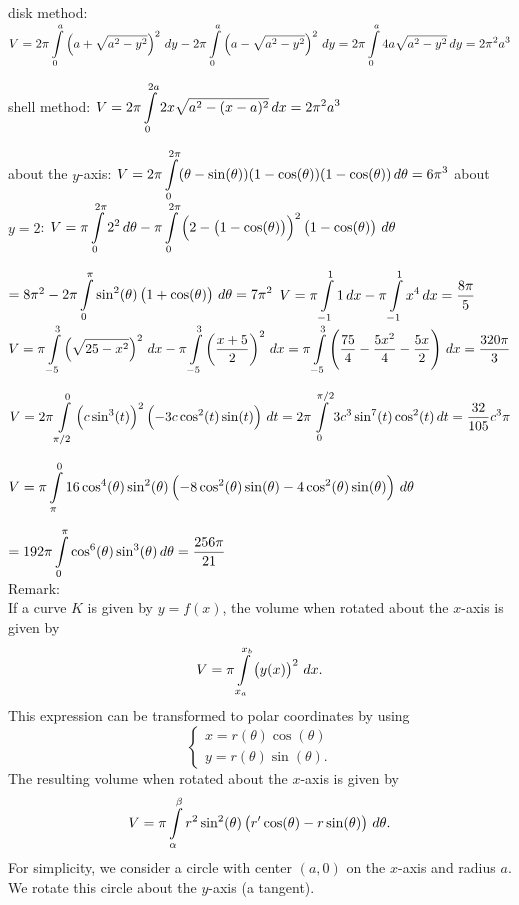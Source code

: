 \begin{Answer}
    disk method:	$V = 2\pi \displaystyle \int\limits_{0}^{a} \left(a + \sqrt{a^2 - y^2}  \right)^2 \, dy - 2\pi \displaystyle \int\limits_{0}^{a} \left(a - \sqrt{a^2 - y^2}  \right)^2 \, dy = 2\pi \displaystyle \int\limits_{0}^{a} 4a \sqrt{a^2 - y^2}  \, dy =  2 \pi^2 a^3$
    
     shell method:	$V = 2\pi \displaystyle \int\limits_{0}^{2a} 2x \sqrt{a^2 - (x-a)^2} \, dx = 2 \pi^2 a^3$
    \fi
    
    \ifanalysis
    \Question \subQuestion about the $y$-axis: $V = 2 \pi \displaystyle \int\limits_{0}^{2\pi} (\theta - \sin(\theta))(1-\cos(\theta))(1-\cos(\theta))  \, d\theta  = 6\pi^3$
    \subQuestion  about $y=2$: $V = \pi \displaystyle \int\limits_{0}^{2\pi} 2^2 \, d\theta-  \pi \displaystyle \int\limits_{0}^{2\pi} \left( 2 - \left(1-\cos(\theta)\right) \right)^2\left(1-\cos(\theta)\right)  \, d\theta $ \par
    \hspace{3cm} $= 8 \pi^2 - 2 \pi \displaystyle \int\limits_{0}^{\pi} \sin^2(\theta)\left(1+\cos(\theta)\right)  \, d\theta = 7 \pi^2$
    \Question $V = \pi \displaystyle \int\limits_{-1}^{1} 1 \, dx - \pi \displaystyle \int\limits_{-1}^{1} x^4 \, dx = \dfrac{8 \pi}{5}$ 
    \Question $V = \pi \displaystyle \int\limits_{-5}^{3}\left(\sqrt{25-x^2}\right)^2 \, dx - \pi \displaystyle \int\limits_{-5}^{3} \left(\dfrac{x+5}{2} \right)^2 \, dx =  \pi \displaystyle \int\limits_{-5}^{3}\left(\dfrac{75}{4} - \dfrac{5x^2}{4} - \dfrac{5x}{2} \right) \, dx = \dfrac{320 \pi}{3}  $
    
    \Question $V = 2 \pi \displaystyle \int\limits_{\pi/2}^{0} \left( c \sin^3(t) \right)^2 \left(-3c \cos^2(t) \sin(t) \right) \, dt = 2 \pi \displaystyle \int\limits_{0}^{\pi/2} 3 c^3 \sin^7(t) \cos^2(t) \, dt = \dfrac{32}{105}c^3 \pi $
     
    \Question $V = 
    \pi \displaystyle \int\limits_{\pi}^{0} 16 \cos^4(\theta)\sin^2(\theta) \left( -8 \cos^2(\theta)\sin(\theta) -4 \cos^2(\theta)\sin(\theta) \right) \, d\theta$ \par
    \hspace{0.3cm} $=192 \pi \displaystyle \int\limits_{0}^{\pi} \cos^6(\theta)\sin^3(\theta) \, d\theta = \dfrac{256 \pi}{21}$ \\[0.2cm]
    Remark: \\
    If a curve $K$ is given by $y=f(x)$, the volume when rotated about the $x$-axis is given by
    \[ V = \pi \displaystyle \int\limits_{x_a}^{x_b} \left( y(x) \right)^2 \, dx. \]
    This expression can be transformed to polar coordinates by using
    \[ \left\{ \begin{array}{l} x = r(\theta) \cos(\theta) \\ y = r(\theta) \sin(\theta). \end{array} \right. \]
    The resulting volume when rotated about the $x$-axis is given by
    \[  V = \pi \displaystyle \int\limits_{\alpha}^{\beta} r^2 \sin^2(\theta)\left( r' \cos(\theta) - r \sin(\theta) \right) \, d\theta.   \]
    \Question For simplicity, we consider a circle with center $(a,0)$ on the $x$-axis and radius $a$. We rotate this circle about the $y$-axis (a tangent). 
    

\end{Answer}
